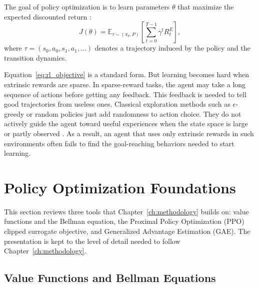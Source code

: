 The goal of policy optimization is to learn parameters $\theta$ that maximize the expected discounted return \cite{sutton2018rl}:
\begin{equation}
J(\theta) = \mathbb{E}_{\tau \sim (\pi_\theta, P)} \left[\sum_{t=0}^{T-1} \gamma^t R_t^E \right],
\label{eq:rl_objective}
\end{equation}
where $\tau = (s_0, a_0, s_1, a_1, \dots)$ denotes a trajectory induced by the policy and the transition dynamics.

Equation~\eqref{eq:rl_objective} is a standard form. But learning becomes hard when extrinsic rewards are sparse. In sparse-reward tasks, the agent may take a long sequence of actions before getting any feedback. This feedback is needed to tell good trajectories from useless ones. Classical exploration methods such as $\epsilon$-greedy or random policies just add randomness to action choice. They do not actively guide the agent toward useful experiences when the state space is large or partly observed \cite{francois2018deep}. As a result, an agent that uses only extrinsic rewards in such environments often fails to find the goal-reaching behaviors needed to start learning.

\section{Policy Optimization Foundations}
\label{sec:policy_optimization_foundations}

This section reviews three tools that Chapter~\ref{ch:methodology} builds on: value functions and the Bellman equation, the Proximal Policy Optimization (PPO) clipped surrogate objective, and Generalized Advantage Estimation (GAE). The presentation is kept to the level of detail needed to follow Chapter~\ref{ch:methodology}.

\subsection{Value Functions and Bellman Equations}
\label{sec:value_functions}

